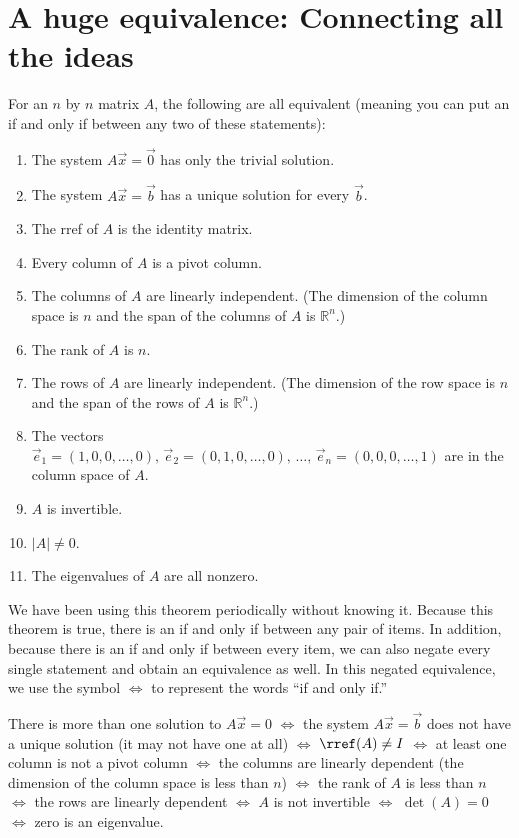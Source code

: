 














\section{A huge equivalence: Connecting all the ideas}

\begin{theorem}\label{huge equivalence}
 For an $n$ by $n$ matrix $A$, the following are all equivalent (meaning you can put an if and only if between any two of these statements):
\begin{enumerate}
	\item The system $A\vec x=\vec 0$ has only the trivial solution.
	\item The system $A\vec x=\vec b$ has a unique solution for every $\vec b$.
	\item The rref of $A$ is the identity matrix.
	\item Every column of $A$ is a pivot column. 
	\item The columns of $A$ are linearly independent. (The dimension of the column space is $n$ and the span of the columns of $A$ is ${\mathbb{R}}^n$.)
	\item The rank of $A$ is $n$.
	\item The rows of $A$ are linearly independent. (The dimension of the row space is $n$ and the span of the rows of $A$ is ${\mathbb{R}}^n$.)
	\item The vectors $\vec e_1 = (1,0,0,\ldots,0),\, \vec e_2 = (0,1,0,\ldots,0),\,\ldots,\, \vec e_n = (0,0,0,\ldots,1)$ are in the column space of $A$.
	\item $A$ is invertible.
	\item $|A|\neq 0$.
	\item The eigenvalues of $A$ are all nonzero.	
\end{enumerate}
\end{theorem}

We have been using this theorem periodically without knowing it. Because this theorem is true, there is an if and only if between any pair of items.  In addition, because there is an if and only if between every item, we can also negate every single statement and obtain an equivalence as well.  In this negated equivalence, we use the symbol $\iff$ to represent the words ``if and only if.''
\begin{theorem}\label{huge equivalence negated}
	There is more than one solution to  $A\vec x=0$ $\iff$ the system $A\vec x=\vec b$ does not have a unique solution (it may not have one at all) $\iff$ $\rref(A)\neq I$  $\iff$ at least one column is not a pivot column  $\iff$ the columns are linearly dependent (the dimension of the column space is less than $n$)  $\iff$ the rank of $A$ is less than $n$  $\iff$ the rows are linearly dependent  $\iff$ $A$ is not invertible $\iff$ $\det(A)=0$  $\iff$ zero is an eigenvalue.
\end{theorem}

